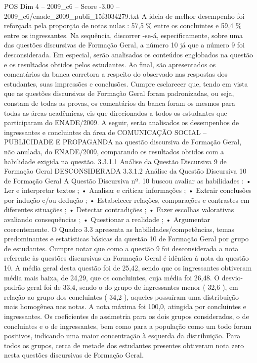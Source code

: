\begin{textsample}{POS Dim 4 – 2009\_c6 – Score -3.00 – 2009\_c6/enade\_2009\_publi\_15f3034279.txt}
A ideia de melhor desempenho foi reforçada pela proporção de notas nulas : 57,5 \% entre os concluintes e 59,4 \% entre os ingressantes.
Na sequência, discorrer -se-á, especificamente, sobre uma das questões discursivas de Formação Geral, a número 10 já que a número 9 foi desconsiderada.
Em especial, serão analisados os conteúdos englobados na questão e os resultados obtidos pelos estudantes.
Ao final, são apresentados os comentários da banca corretora a respeito do observado nas respostas dos estudantes, suas impressões e conclusões.
Cumpre esclarecer que, tendo em vista que as questões discursivas de Formação Geral foram padronizadas, ou seja, constam de todas as provas, os comentários da banca foram os mesmos para todas as áreas acadêmicas, eis que direcionados a todos os estudantes que participaram do ENADE/2009.
A seguir, serão analisados os desempenhos de ingressantes e concluintes da área de COMUNICAÇÃO SOCIAL – PUBLICIDADE E PROPAGANDA na questão discursiva de Formação Geral, não anulada, do ENADE/2009, comparando os resultados obtidos com a habilidade exigida na questão. 3.3.1.1 Análise da Questão Discursiva 9 de Formação Geral DESCONSIDERADA 3.3.1.2 Análise da Questão Discursiva 10 de Formação Geral A Questão Discursiva nº. 10 buscou avaliar as habilidades : • Ler e interpretar textos ; • Analisar e criticar informações ; • Extrair conclusões por indução e/ou dedução ; • Estabelecer relações, comparações e contrastes em diferentes situações ; • Detectar contradições ; • Fazer escolhas valorativas avaliando consequências ; • Questionar a realidade ; • Argumentar coerentemente.
O Quadro 3.3 apresenta as habilidades/competências, temas predominantes e estatísticas básicas da questão 10 de Formação Geral por grupo de estudantes.
Cumpre notar que como a questão 9 foi desconsiderada a nota referente às questões discursivas da Formação Geral é idêntica à nota da questão 10.
A média geral desta questão foi de 25,42, sendo que os ingressantes obtiveram média mais baixa, de 24,29, que os concluintes, cuja média foi 26,48.
O desvio-padrão geral foi de 33,4, sendo o do grupo de ingressantes menor ( 32,6 ), em relação ao grupo dos concluintes ( 34,2 ), aqueles possuíram uma distribuição mais homogênea nas notas.
A nota máxima foi 100,0, atingida por concluintes e ingressantes.
Os coeficientes de assimetria para os dois grupos considerados, o de concluintes e o de ingressantes, bem como para a população como um todo foram positivos, indicando uma maior concentração à esquerda da distribuição.
Para todos os grupos, cerca de metade dos estudantes presentes obtiveram nota zero nesta questões discursivas de Formação Geral.

\end{textsample}
